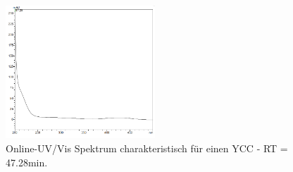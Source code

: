 \begin{figure}[!htbp]
  \centering
  \includegraphics[width=0.5\textwidth]{figures/Kapitel6/Reaktion3h/YCC4728.png}
  \caption{}
  \label{fig:YCC4728}
  \caption[Online-UV/Vis Spektren mit der Charakteristik eines YCC bei 47.28min., Quelle: Autor]{Online-UV/Vis Spektrum charakteristisch für einen  \gls{YCC} - RT = 47.28min.}
\end{figure}

